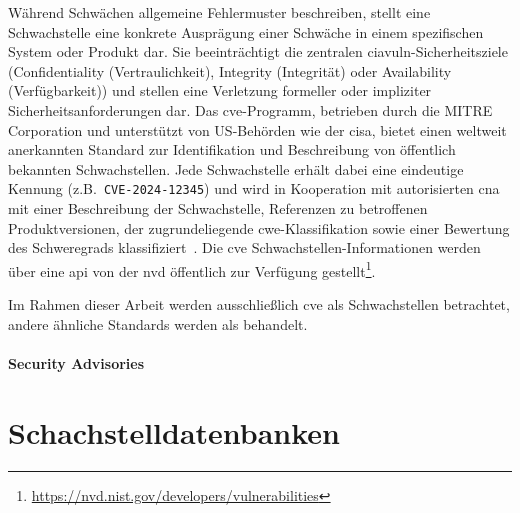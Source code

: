Während Schwächen allgemeine Fehlermuster beschreiben, stellt eine Schwachstelle eine konkrete Ausprägung einer Schwäche in einem spezifischen System oder Produkt dar.
Sie beeinträchtigt die zentralen \acrshort{ciavuln}-Sicherheitsziele (Confidentiality (Vertraulichkeit), Integrity (Integrität) oder Availability (Verfügbarkeit)) und stellen eine Verletzung formeller oder impliziter Sicherheitsanforderungen dar.
Das \acrshort{cve}-Programm, betrieben durch die MITRE Corporation und unterstützt von US-Behörden wie der \acrfull{cisa}, bietet einen weltweit anerkannten Standard zur Identifikation und Beschreibung von öffentlich bekannten Schwachstellen.
Jede Schwachstelle erhält dabei eine eindeutige Kennung (z.B.\ \verb+CVE-2024-12345+) und wird in Kooperation mit autorisierten \acrfull{cna} mit einer Beschreibung der Schwachstelle, Referenzen zu betroffenen Produktversionen, der zugrundeliegende \acrshort{cwe}-Klassifikation sowie einer Bewertung des Schweregrads klassifiziert\ \autocite{Ross_Winstead_McEvilley_2022, CveGlossaryCommonVulnerabilitiesAndExposures12mai2025}.
Die \acrshort{cve} Schwachstellen-Informationen werden über eine \acrshort{api} von der \acrshort{nvd} öffentlich zur Verfügung gestellt\footnote{\url{https://nvd.nist.gov/developers/vulnerabilities}}.

Im Rahmen dieser Arbeit werden ausschließlich \acrshort{cve} als Schwachstellen betrachtet, andere ähnliche Standards werden als  behandelt.

\paragraph{Security Advisories}\label{par:security-advisories}



\section{Schachstelldatenbanken}\label{sec:security-vulnerability-databases}



